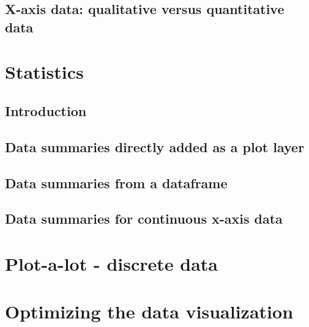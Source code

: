 \documentclass[
]{book}
\begin{document}
\hypertarget{x-axis-data-qualitative-versus-quantitative-data}{%
\subsection{X-axis data: qualitative versus quantitative data}\label{x-axis-data-qualitative-versus-quantitative-data}}

\hypertarget{statistics}{%
\section{Statistics}\label{statistics}}

\hypertarget{introduction-1}{%
\subsection{Introduction}\label{introduction-1}}

\hypertarget{data-summaries-directly-added-as-a-plot-layer}{%
\subsection{Data summaries directly added as a plot layer}\label{data-summaries-directly-added-as-a-plot-layer}}

\hypertarget{data-summaries-from-a-dataframe}{%
\subsection{Data summaries from a dataframe}\label{data-summaries-from-a-dataframe}}

\hypertarget{data-summaries-for-continuous-x-axis-data}{%
\subsection{Data summaries for continuous x-axis data}\label{data-summaries-for-continuous-x-axis-data}}

\hypertarget{plot-a-lot---discrete-data}{%
\section{Plot-a-lot - discrete data}\label{plot-a-lot---discrete-data}}

\hypertarget{optimizing-the-data-visualization}{%
\section{Optimizing the data visualization}\label{optimizing-the-data-visualization}}
\end{document}
